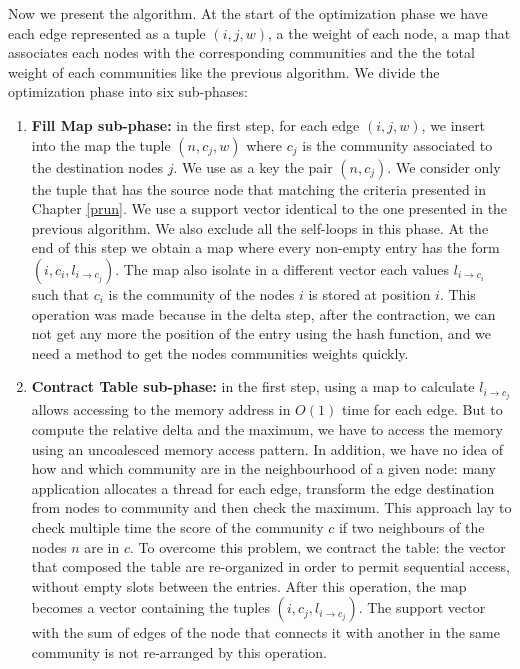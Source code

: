 Now we present the algorithm. At the start of the optimization phase we have each edge represented as a tuple $(i,j,w)$,  a the weight of each node,  a map that associates each nodes with the corresponding communities  and the the total weight of each communities like the previous algorithm. 
We divide the optimization phase into six sub-phases:
\begin{enumerate}
	\item \textbf{Fill Map sub-phase:} in the first step, for each edge $(i,j,w)$, we insert into the map the tuple $(n, c_j, w)$ where $c_j$ is the community associated to the destination nodes $j$. We use as a key the pair $(n,c_j)$.
	We consider only the tuple that has the source node that matching the criteria presented in Chapter \ref{prun}. We use a support vector identical to the one presented in the previous algorithm. We also exclude all the self-loops in this phase. At the end of this step we obtain a map where every non-empty entry has the form $(i, c_i, l_{i \rightarrow c_j})$. The map also isolate in a different vector each values $l_{i \rightarrow c_i}$ such that $c_i$ is the community of the nodes $i$ is stored at position $i$. This operation was made because in the delta step, after the contraction, we can not get any more the position of the entry using the hash function, and we need a method to get the nodes communities weights quickly. 
	
	\item \textbf{Contract Table sub-phase:} in the first step, using a map to calculate $l_{i \rightarrow c_j}$ allows accessing to the memory address in $O(1)$ time for each edge. But to compute the relative delta and the maximum, we have to access the memory using an uncoalesced memory access pattern. In addition, we have no idea of how and which community are in the neighbourhood of a given node: many application allocates a thread for each edge, transform the edge destination from nodes to community and then check the maximum. This approach lay to check multiple time the score of the community $c$ if two neighbours of the nodes $n$ are in $c$. To overcome this problem, we contract the table: the vector that composed the table are re-organized in order to permit sequential access, without empty slots between the entries. After this operation, the map becomes a vector containing the tuples $(i, c_j,l_{i \rightarrow c_j})$. The support vector with the sum of edges of the node that connects it with another in the same community is not re-arranged by this operation.
	

\end{enumerate}
